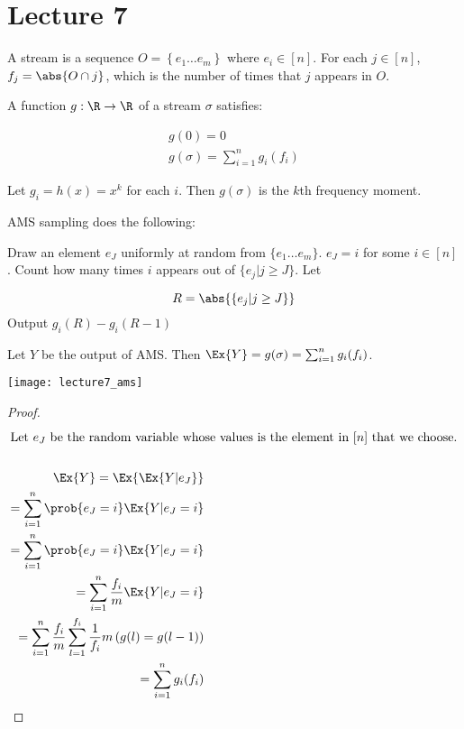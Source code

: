 \documentclass[../main.tex]{subfiles}
\begin{document}
\section{Lecture 7}

\begin{definition}
    A stream is a sequence $O = \left\{ e_1 \dots e_m \right\}$ where $e_i \in [n]$. For each $j \in [n]$, $f_j = \abs{O \cap j}$, which is the number of times that $j$ appears in $O$.
\end{definition}

\begin{definition}
    A function $g: \R \to \R$ of a stream $\sigma$ satisfies:

    \begin{align*}
        g(0) = 0 \\
        g(\sigma) = \sum_{i=1}^{n}g_i(f_i)
    \end{align*}
\end{definition}

\begin{example}
    Let $g_i = h(x) = x^k$ for each $i$. Then $g(\sigma)$ is the $k$th frequency moment.
\end{example}

\begin{remark}
    AMS sampling does the following:

    \begin{outline}
        \1 Draw an element $e_J$ uniformly at random from $\{e_1 \dots e_m\}$.
        \2 $e_J = i$ for some $i \in [n]$.
        \1 Count how many times $i$ appears out of $\{e_j | j \geq J\}$.
        \1 Let

        \[
            R = \abs{ \left\{ e_j | j \geq J \right\}}
        \]
        \1 Output $g_i(R) - g_i(R-1)$
    \end{outline}
\end{remark}

\begin{lemma}
    Let $Y$ be the output of AMS. Then $\Ex{Y} = g(\sigma) = \sum_{i=1}^{n}g_{i}(f_{i})$.
    \begin{center}
        \texttt{[image: lecture7\_ams]}
    \end{center}
\end{lemma}
\begin{proof}
    \begin{align*}
        \intertext{Let $e_J$ be the random variable whose values is the element in $[n]$ that we choose.} \\
        \Ex{Y} = \Ex{\Ex{Y | e_J}} \\
         = \sum_{i=1}^{n} \prob{e_J = i} \Ex{Y | e_J=i} \\
         = \sum_{i=1}^{n} \prob{e_J = i} \Ex{Y | e_J=i} \\
         = \sum_{i=1}^{n} \frac{f_i}{m} \Ex{Y | e_J=i} \\
         = \sum_{i=1}^{n} \frac{f_i}{m} \sum_{l=1}^{f_i}\frac{1}{f_i} m\left( g(l) = g(l-1) \right) \\
         = \sum_{i=1}^{n}g_i(f_i)
    \end{align*}
\end{proof}
\end{document}
